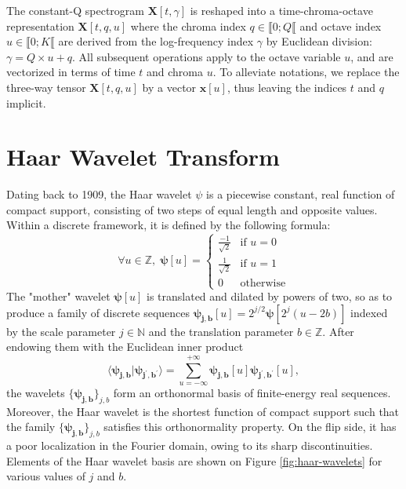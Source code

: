 \documentclass{article}
\begin{document}
The constant-Q spectrogram $\boldsymbol{X}[t, \gamma]$ is reshaped into a time-chroma-octave
representation $\boldsymbol{X}[t, q, u]$ where the chroma index $q \in \llbracket 0 ; Q \llbracket$ and
octave index $u \in \llbracket 0 ; K \llbracket$ are derived from the log-frequency index $\gamma$
by Euclidean division: $\gamma = Q \times u + q$.
All subsequent operations apply to the octave variable $u$, and are vectorized in terms of time
$t$ and chroma $u$. To alleviate notations, we replace the three-way tensor $\boldsymbol{X}[t, q, u]$
by a vector $\boldsymbol{x}[u]$, thus leaving the indices $t$ and $q$ implicit.


\section{Haar Wavelet Transform}\label{sec:haar}
Dating back to 1909, the Haar wavelet $\psi$ is a piecewise constant, real function of compact
support, consisting of two steps of equal length and opposite values. Within a discrete framework,
it is defined by the following formula:
\begin{equation}
\forall u \in \mathbb{Z}, \;
\boldsymbol{\psi}[u] = \left\{ \begin{array}{cl}
\frac{-1}{\sqrt{2}} & \mbox{if }u = 0\\
\frac{1}{\sqrt{2}} & \mbox{if }u = 1\\
0 & \mbox{otherwise}
\end{array}\right.
\end{equation}
The "mother" wavelet $\boldsymbol{\psi}[u]$ is translated and dilated by powers of two, so as to
produce a family of discrete sequences
$\boldsymbol{\psi_{j,b}}[u] = 2^{j/2} \boldsymbol{\psi}[2^j (u - 2b)]$
indexed by the scale parameter $j \in \mathbb{N}$ and the translation parameter $b \in \mathbb{Z}$.
After endowing them with the Euclidean inner product
\begin{equation}
\langle \boldsymbol{\psi_{j,b}} \vert \boldsymbol{\psi_{j^\prime,b^\prime}} \rangle
 =
 \sum_{u = -\infty}^{+\infty}
 \boldsymbol{\psi_{j, b}}[u]
  \boldsymbol{\psi_{j^\prime,b^\prime}}[u],
\end{equation}
the wavelets $\{\boldsymbol{\psi_{j,b}}\}_{j,b}$ form an orthonormal basis of finite-energy
real sequences.
Moreover, the Haar wavelet is the shortest function of compact support such that the family
$\{\boldsymbol{\psi_{j,b}}\}_{j,b}$ satisfies this orthonormality property.
On the flip side, it has a poor localization in the Fourier domain, owing to its sharp discontinuities.
Elements of the Haar wavelet basis are shown on Figure \ref{fig:haar-wavelets}
for various values of $j$ and $b$.
\end{document}
